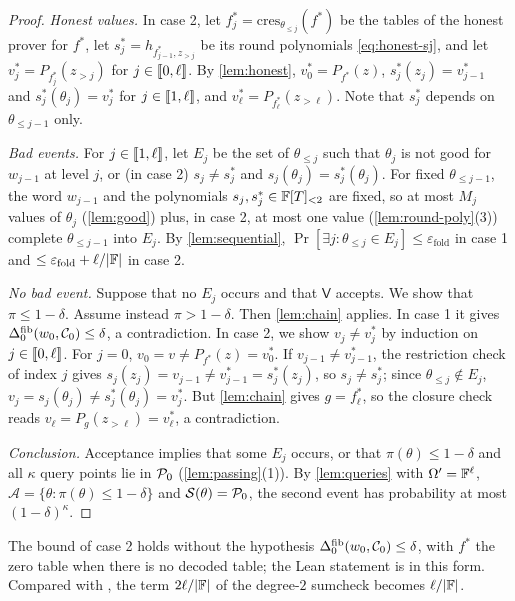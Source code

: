 \begin{proof}
\emph{Honest values.} In case 2, let $f^*_j = \mathrm{cres}_{\theta_{\le j}}(f^*)$ be the tables of the honest prover for $f^*$, let $s^*_j = h_{f^*_{j-1}, z_{>j}}$ be its round polynomials \eqref{eq:honest-sj}, and let $v^*_j = P_{f^*_j}(z_{>j})$ for $j \in \llbracket 0, \ell \rrbracket$.
By \cref{lem:honest}, $v^*_0 = P_{f^*}(z)$, $s^*_j(z_j) = v^*_{j-1}$ and $s^*_j(\theta_j) = v^*_j$ for $j \in \llbracket 1, \ell \rrbracket$, and $v^*_\ell = P_{f^*_\ell}(z_{>\ell})$.
Note that $s^*_j$ depends on $\theta_{\le j-1}$ only.

\emph{Bad events.} For $j \in \llbracket 1, \ell \rrbracket$, let $E_j$ be the set of $\theta_{\le j}$ such that $\theta_j$ is not good for $w_{j-1}$ at level $j$, or (in case 2) $s_j \ne s^*_j$ and $s_j(\theta_j) = s^*_j(\theta_j)$.
For fixed $\theta_{\le j-1}$, the word $w_{j-1}$ and the polynomials $s_j, s^*_j \in \mathbb{F}[T]_{<2}$ are fixed, so at most $M_j$ values of $\theta_j$ (\cref{lem:good}) plus, in case 2, at most one value (\cref{lem:round-poly}(3)) complete $\theta_{\le j-1}$ into $E_j$.
By \cref{lem:sequential}, $\Pr[\exists j : \theta_{\le j} \in E_j] \le \varepsilon_{\mathrm{fold}}$ in case 1 and $\le \varepsilon_{\mathrm{fold}} + \ell/|\mathbb{F}|$ in case 2.

\emph{No bad event.} Suppose that no $E_j$ occurs and that $\mathsf{V}$ accepts. We show that $\pi \le 1-\delta$.
Assume instead $\pi > 1-\delta$. Then \cref{lem:chain} applies. In case 1 it gives $\Delta^{\mathrm{fib}}_0(w_0,\mathcal{C}_0) \le \delta$, a contradiction.
In case 2, we show $v_j \ne v^*_j$ by induction on $j \in \llbracket 0, \ell \rrbracket$.
For $j = 0$, $v_0 = v \ne P_{f^*}(z) = v^*_0$.
If $v_{j-1} \ne v^*_{j-1}$, the restriction check of index $j$ gives $s_j(z_j) = v_{j-1} \ne v^*_{j-1} = s^*_j(z_j)$, so $s_j \ne s^*_j$; since $\theta_{\le j} \notin E_j$, $v_j = s_j(\theta_j) \ne s^*_j(\theta_j) = v^*_j$.
But \cref{lem:chain} gives $g = f^*_\ell$, so the closure check reads $v_\ell = P_g(z_{>\ell}) = v^*_\ell$, a contradiction.

\emph{Conclusion.} Acceptance implies that some $E_j$ occurs, or that $\pi(\theta) \le 1-\delta$ and all $\kappa$ query points lie in $\mathcal{P}_0$ (\cref{lem:passing}(1)).
By \cref{lem:queries} with $\Omega' = \mathbb{F}^\ell$, $\mathcal{A} = \{\theta : \pi(\theta) \le 1-\delta\}$ and $\mathcal{S}(\theta) = \mathcal{P}_0$, the second event has probability at most $(1-\delta)^\kappa$.
\end{proof}

The bound of case 2 holds without the hypothesis $\Delta^{\mathrm{fib}}_0(w_0, \mathcal{C}_0) \le \delta$, with $f^*$ the zero table when there is no decoded table; the Lean statement is in this form.
Compared with , the term $2\ell/|\mathbb{F}|$ of the degree-$2$ sumcheck becomes $\ell/|\mathbb{F}|$.

